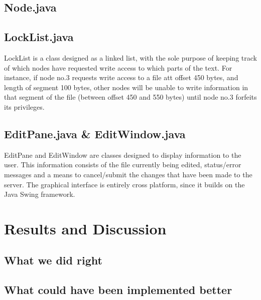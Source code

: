 \documentclass[12pt]{article}
\begin{document}
\subsection{Node.java} %
\label{sub:node_java}


\subsection{LockList.java} %
\label{sub:locklist_java}

LockList is a class designed as a linked list, with the sole purpose of keeping track of which nodes have requested write access to which parts of the text. For instance, if node no.3 requests write access to a file att offset 450 bytes, and length of segment 100 bytes, other nodes will be unable to write information in that segment of the file (between offset 450 and 550 bytes) until node no.3 forfeits its privileges.

\subsection{EditPane.java \& EditWindow.java} %
\label{sub:editpane}

EditPane and EditWindow are classes designed to display information to the user. This information consists of the file currently being edited, status/error messages and a means to cancel/submit the changes that have been made to the server. The graphical interface is entirely cross platform, since it builds on the Java Swing framework.


\section{Results and Discussion} %
\label{sec:results_and_discussion}

\subsection{What we did right} %
\label{sub:what_we_did_right}



\subsection{What could have been implemented better} %
\label{sub:what_could_have_been_implemented_better}
\end{document}
